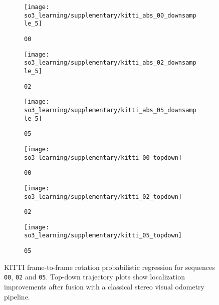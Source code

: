 \begin{figure*}[h!]
	\centering
	\begin{subfigure}[]{0.33\textwidth}
		\texttt{[image: so3\_learning/supplementary/kitti\_abs\_00\_downsample\_5]}
		\caption{\texttt{00}}
	\end{subfigure}
	\begin{subfigure}[]{0.33\textwidth} 
		\texttt{[image: so3\_learning/supplementary/kitti\_abs\_02\_downsample\_5]}
		\caption{\texttt{02}}
	\end{subfigure}
	\begin{subfigure}[]{0.33\textwidth} 
		\texttt{[image: so3\_learning/supplementary/kitti\_abs\_05\_downsample\_5]}
		\caption{\texttt{05}}
	\end{subfigure}
	\begin{subfigure}[]{0.33\textwidth} 
		\texttt{[image: so3\_learning/supplementary/kitti\_00\_topdown]}
		\caption{\texttt{00}}
	\end{subfigure}
	\begin{subfigure}[]{0.33\textwidth} 
		\texttt{[image: so3\_learning/supplementary/kitti\_02\_topdown]}
		\caption{\texttt{02}}
	\end{subfigure}
	\begin{subfigure}[]{0.33\textwidth} 
		\texttt{[image: so3\_learning/supplementary/kitti\_05\_topdown]}
		\caption{\texttt{05}}
	\end{subfigure}
	\caption{KITTI frame-to-frame rotation probabilistic regression for sequences \texttt{00}, \texttt{02} and \texttt{05}. Top-down trajectory plots show localization improvements after fusion with a classical stereo visual odometry pipeline.}
	\label{fig:kitti_regression}
\end{figure*}


